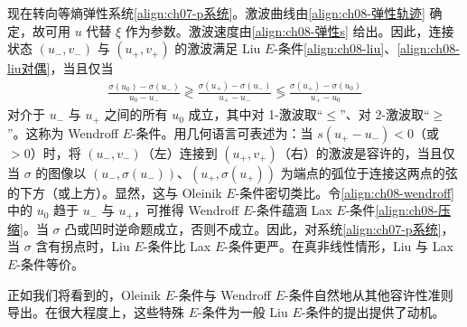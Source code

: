 \documentclass[../../main.tex]{subfiles}
\begin{document}
现在转向等熵弹性系统\eqref{align:ch07-p系统}。激波曲线由\eqref{align:ch08-弹性轨迹} 确定，故可用 $u$ 代替 $\xi$ 作为参数。激波速度由\eqref{align:ch08-弹性s} 给出。因此，连接状态 $(u_-,v_-)$ 与 $(u_+,v_+)$ 的激波满足 Liu $E$-条件\eqref{align:ch08-liu}、\eqref{align:ch08-liu对偶}，当且仅当
\begin{align}
\frac{\sigma(u_0)-\sigma(u_-)}{u_0-u_-}\gtrless\frac{\sigma(u_+)-\sigma(u_-)}{u_+-u_-}\lessgtr\frac{\sigma(u_+)-\sigma(u_0)}{u_+-u_0}
\label{align:ch08-wendroff}
\end{align}
对介于 $u_-$ 与 $u_+$ 之间的所有 $u_0$ 成立，其中对 1-激波取“$\leqslant$”、对 2-激波取“$\geqslant$”。这称为 Wendroff $E$-条件。用几何语言可表述为：当 $s(u_+-u_-)<0$（或 $>0$）时，将 $(u_-,v_-)$（左）连接到 $(u_+,v_+)$（右）的激波是容许的，当且仅当 $\sigma$ 的图像以 $(u_-,\sigma(u_-))$、$(u_+,\sigma(u_+))$ 为端点的弧位于连接这两点的弦的下方（或上方）。显然，这与 Oleinik $E$-条件密切类比。令\eqref{align:ch08-wendroff} 中的 $u_0$ 趋于 $u_-$ 与 $u_+$，可推得 Wendroff $E$-条件蕴涵 Lax $E$-条件\eqref{align:ch08-压缩}。当 $\sigma$ 凸或凹时逆命题成立，否则不成立。因此，对系统\eqref{align:ch07-p系统}，当 $\sigma$ 含有拐点时，Liu $E$-条件比 Lax $E$-条件更严。在真非线性情形，Liu 与 Lax $E$-条件等价。

正如我们将看到的，Oleinik $E$-条件与 Wendroff $E$-条件自然地从其他容许性准则导出。在很大程度上，这些特殊 $E$-条件为一般 Liu $E$-条件的提出提供了动机。
\end{document}
